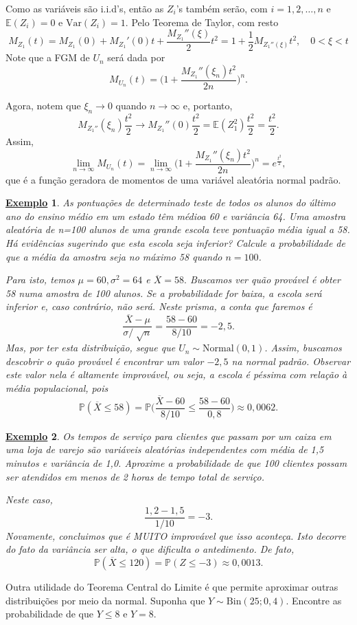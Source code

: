 \documentclass{article}
\newtheorem{example}{\underline{Exemplo}}
\begin{document}
  Como as variáveis são i.i.d's, então as \(Z_{i}\)'s também serão, com \(i=1, 2, \dotsc , n\) e \(\mathbb{E}(Z_{i}) = 0\) e \(\mathrm{Var}(Z_{i}) = 1.\)
Pelo Teorema de Taylor, com resto 
  \[
    M_{Z_{1}}(t) = M_{Z_{1}}(0) + M_{Z_1}'(0)t + \frac{M_{Z_{1}}''(\xi)}{2}t^{2} = 1 + \frac{1}{2}M_{Z_{1}''(\xi)}t^{2},\quad 0 < \xi < t
  \]
  Note que a FGM de \(U_{n}\) será dada por 
    \[
      M_{U_{n}}(t) = \biggl(1 + \frac{M_{Z_{1}}''(\xi_{n})t^{2}}{2n}\biggr)^{n}.
    \] 

  Agora, notem que \(\xi_{n}\to 0 \) quando \(n\to \infty\) e, portanto, 
    \[
      M_{Z_{1}''}(\xi_{n})\frac{t^{2}}{2}\to M_{Z_{1}}''(0)\frac{t^{2}}{2} = \mathbb{E}(Z_{1}^{2})\frac{t^{2}}{2} = \frac{t^{2}}{2}.
    \]
  Assim, 
    \[
    \lim_{n\to \infty}M_{U_{n}}(t) = \lim_{n\to \infty}\biggl(1 + \frac{M_{Z_{1}}''(\xi_{n})t^{2}}{2n}\biggr)^{n} = e^{\frac{t^{2}}{2}},
    \]
  que é a função geradora de momentos de uma variável aleatória normal padrão.
 \begin{example}
  As pontuações de determinado teste de todos os alunos do último ano do ensino médio em um estado têm médioa 60 e variância 64. Uma amostra aleatória de n=100 alunos de uma grande
escola teve pontuação média igual a 58. Há evidências sugerindo que esta escola seja inferior? Calcule a probabilidade de que a média da amostra seja no máximo 58 quando \(n = 100\).

  Para isto, temos \(\mu = 60, \sigma ^{2} = 64\) e \(\overline{X} = 58.\) Buscamos ver quão provável é obter 58 numa amostra de 100 alunos. Se a probabilidade for baixa,
a escola será inferior e, caso contrário, não será. Neste prisma, a conta que faremos é 
  \[
    \frac{\overline{X} - \mu }{\sigma/\sqrt[]{n}} = \frac{58 - 60}{8/10} = -2,5.
  \]
  Mas, por ter esta distribuição, segue que \(U_{n}\sim \mathrm{Normal}(0, 1)\). Assim, buscamos descobrir o quão provável é encontrar um valor
 \(-2,5\) na normal padrão. Observar este valor nela é altamente improvável, ou seja, a escola é péssima com relação à média populacional, pois 
   \[
     \mathbb{P}(\overline{X}\leq 58) = \mathbb{P}\biggl(\frac{\overline{X}-60}{8/10} \leq \frac{58 - 60}{0,8}\biggr)\approx 0,0062.
   \]
 \end{example}
 \begin{example}
  Os tempos de serviço para clientes que passam por um caixa em uma loja de varejo são variáveis aleatórias independentes com média de 1,5 minutos e variância de 1,0.
Aproxime a probabilidade de que 100 clientes possam ser atendidos em menos de 2 horas de tempo total de serviço.
  
  Neste caso, 
    \[
      \frac{1,2 - 1,5}{1/10} = -3.
    \]
  Novamente, concluimos que é MUITO improvável que isso aconteça. Isto decorre do fato da variância ser alta, o que dificulta o antedimento. De fato, 
    \[
      \mathbb{P}(\overline{X} \leq 120) = \mathbb{P}(Z\leq -3)\approx 0,0013.
    \]
 \end{example}
  Outra utilidade do Teorema Central do Limite é que permite aproximar outras distribuições por meio da normal.
   Suponha que \(Y\sim \mathrm{Bin}(25; 0,4)\). Encontre as probabilidade de que \(Y\leq 8\) e \(Y = 8\). 
\newpage
\end{document}
